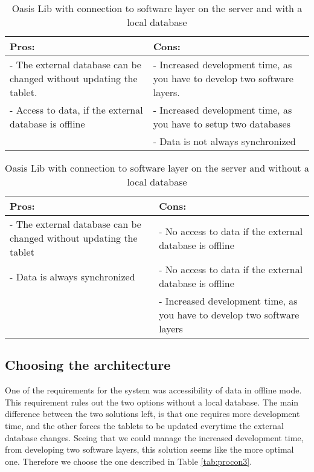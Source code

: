 \begin{table}[htbp]
	\centering
		\begin{tabular}{| p{6cm} | m{6cm} |}
			\hline
			Pros: & Cons: \\ \hline
			- The external database can be changed without updating the tablet. & - Increased development time, as you have to develop two software layers. \\ \hline
			- Access to data, if the external database is offline & - Increased development time, as you have to setup two databases \\ \hline
			& - Data is not always synchronized \\ \hline
		\end{tabular}
	\caption{Oasis Lib with connection to software layer on the server and with a local database}
	\label{tab:procon3}
\end{table}

\begin{table}[htbp]
	\centering
		\begin{tabular}{| p{6cm} | m{6cm} |}
			\hline
			Pros: & Cons: \\ \hline
			- The external database can be changed without updating the tablet & - No access to data if the external database is offline \\ \hline
			- Data is always synchronized & - No access to data if the external database is offline \\ \hline
			& - Increased development time, as you have to develop two software layers \\ \hline
		\end{tabular}
	\caption{Oasis Lib with connection to software layer on the server and without a local database}
	\label{tab:procon4}
\end{table}

\subsection{Choosing the architecture}
One of the requirements for the system was accessibility of data in offline mode.
This requirement rules out the two options without a local database.
The main difference between the two solutions left, is that one requires more development time, and the other forces the tablets to be updated everytime the external database changes.
Seeing that we could manage the increased development time, from developing two software layers, this solution seems like the more optimal one. Therefore we choose the one described in Table \vref{tab:procon3}.